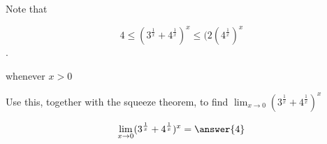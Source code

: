 \documentclass{ximera}
\author{Steven Gubkin}
\begin{document}
\begin{exercise}


Note that 
	
	\[4 \leq (3^{\frac{1}{x}}+ 4^{\frac{1}{x}})^x \leq  (2 (4^{\frac{1}{x}})^x\].
	
	whenever $x>0$
	
	Use this, together with the squeeze theorem, to find $\lim_{x \to 0} (3^{\frac{1}{x}}+ 4^{\frac{1}{x}})^x$
	
	\[\lim_{x \to 0} (3^{\frac{1}{x}}+ 4^{\frac{1}{x}})^x = \answer{4}\]

\end{exercise}
\end{document}
